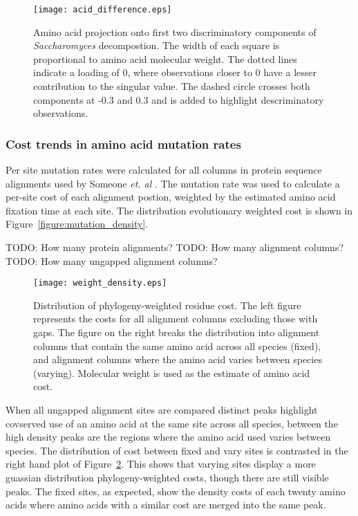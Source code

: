 \begin{figure}
  \centering
  \texttt{[image: acid\_difference.eps]}
  \caption[Amino acid projection onto first two discriminatory components of \emph{Saccharomyces} decompostion]{Amino acid projection onto first two discriminatory components of \emph{Saccharomyces} decompostion. The width of each square is proportional to amino acid molecular weight. The dotted lines indicate a loading of 0, where observations closer to 0 have a lesser contribution to the singular value. The dashed circle crosses both components at -0.3 and 0.3 and is added to highlight descriminatory observations.}
  \label{figure:acid_decomp}
\end{figure}

\subsubsection{Cost trends in amino acid mutation rates}

Per site mutation rates were calculated for all columns in protein sequence alignments used by Someone \emph{et. al} \cite{alignment}. The mutation rate was used to calculate a per-site cost of each alignment postion, weighted by the estimated amino acid fixation time at each site. The distribution evolutionary weighted cost is shown in Figure~\vref{figure:mutation_density}.

TODO: How many protein alignments?
TODO: How many alignment columns?
TODO: How many ungapped alignment columns?

\begin{figure}
  \centering
  \texttt{[image: weight\_density.eps]}
  \caption[Distribution of phylogeny-weighted residue cost.]{Distribution of phylogeny-weighted residue cost. The left figure represents the costs for all alignment columns excluding those with gaps. The figure on the right breaks the distribution into alignment columns that contain the same amino acid across all species (fixed), and alignment columns where the amino acid varies between species (varying). Molecular weight is used as the estimate of amino acid cost.}
  \label{figure:mutation_density}
\end{figure}

When all ungapped alignment sites are compared distinct peaks highlight covserved use of an amino acid at the same site across all species, between the high density peaks are the regions where the amino acid used varies between species. The distribution of cost between fixed and vary sites is contrasted in the right hand plot of Figure~\ref{figure:mutation_density}. This shows that varying sites display a more guassian distribution phylogeny-weighted costs, though there are still visible peaks. The fixed sites, as expected, show the density costs of each twenty amino acids where amino acids with a similar cost are merged into the same peak.

